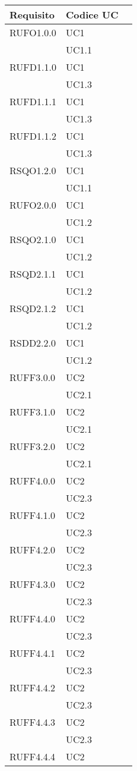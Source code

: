 \begin{center}
\begin{longtable}{lp{}l}
\toprule Requisito & Codice UC\\
\midrule
RUFO1.0.0 & UC1 \\
 & UC1.1 \\
RUFD1.1.0 & UC1 \\
 & UC1.3 \\
RUFD1.1.1 & UC1 \\
 & UC1.3 \\
RUFD1.1.2 & UC1 \\
 & UC1.3 \\
RSQO1.2.0 & UC1 \\
 & UC1.1 \\
RUFO2.0.0 & UC1 \\
 & UC1.2 \\
RSQO2.1.0 & UC1 \\
 & UC1.2 \\
RSQD2.1.1 & UC1 \\
 & UC1.2 \\
RSQD2.1.2 & UC1 \\
 & UC1.2 \\
RSDD2.2.0 & UC1 \\
 & UC1.2 \\
RUFF3.0.0 & UC2 \\
 & UC2.1 \\
RUFF3.1.0 & UC2 \\
 & UC2.1 \\
RUFF3.2.0 & UC2 \\
 & UC2.1 \\
RUFF4.0.0 & UC2 \\
 & UC2.3 \\
RUFF4.1.0 & UC2 \\
 & UC2.3 \\
RUFF4.2.0 & UC2 \\
 & UC2.3 \\
RUFF4.3.0 & UC2 \\
 & UC2.3 \\
RUFF4.4.0 & UC2 \\
 & UC2.3 \\
RUFF4.4.1 & UC2 \\
 & UC2.3 \\
RUFF4.4.2 & UC2 \\
 & UC2.3 \\
RUFF4.4.3 & UC2 \\
 & UC2.3 \\
RUFF4.4.4 & UC2 \\

\end{longtable}
\end{center}
